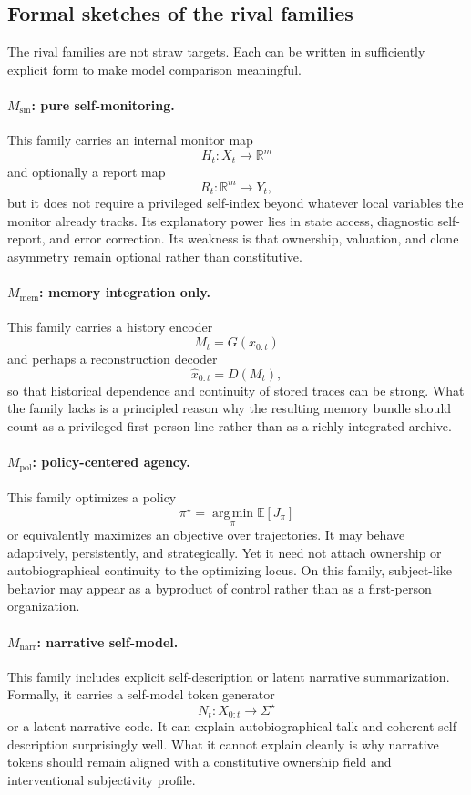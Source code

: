 \documentclass[11pt,a4paper]{article}
\theoremstyle{definition}
\newcommand{\argmin}{\operatorname*{arg\,min}}
\begin{document}
\subsection{Formal sketches of the rival families}
The rival families are not straw targets. Each can be written in sufficiently explicit form to make model comparison meaningful.

\paragraph{$M_{\mathrm{sm}}$: pure self-monitoring.}
This family carries an internal monitor map
\[
H_t:X_t\to \mathbb{R}^m
\]
and optionally a report map
\[
R_t:\mathbb{R}^m\to Y_t,
\]
but it does not require a privileged self-index beyond whatever local variables the monitor already tracks. Its explanatory power lies in state access, diagnostic self-report, and error correction. Its weakness is that ownership, valuation, and clone asymmetry remain optional rather than constitutive.

\paragraph{$M_{\mathrm{mem}}$: memory integration only.}
This family carries a history encoder
\[
M_t = G(x_{0:t})
\]
and perhaps a reconstruction decoder
\[
\widehat{x}_{0:t}=D(M_t),
\]
so that historical dependence and continuity of stored traces can be strong. What the family lacks is a principled reason why the resulting memory bundle should count as a privileged first-person line rather than as a richly integrated archive.

\paragraph{$M_{\mathrm{pol}}$: policy-centered agency.}
This family optimizes a policy
\[
\pi^\star=\argmin_{\pi}\mathbb{E}[J_\pi]
\]
or equivalently maximizes an objective over trajectories. It may behave adaptively, persistently, and strategically. Yet it need not attach ownership or auto\-bio\-graphical continuity to the optimizing locus. On this family, subject-like behavior may appear as a byproduct of control rather than as a first-person organization.

\paragraph{$M_{\mathrm{narr}}$: narrative self-model.}
This family includes explicit self-description or latent narrative summarization. Formally, it carries a self-model token generator
\[
N_t:X_{0:t}\to \Sigma^\star
\]
or a latent narrative code. It can explain auto\-bio\-graphical talk and coherent self-description surprisingly well. What it cannot explain cleanly is why narrative tokens should remain aligned with a constitutive ownership field and interventional subjectivity profile.
\end{document}
